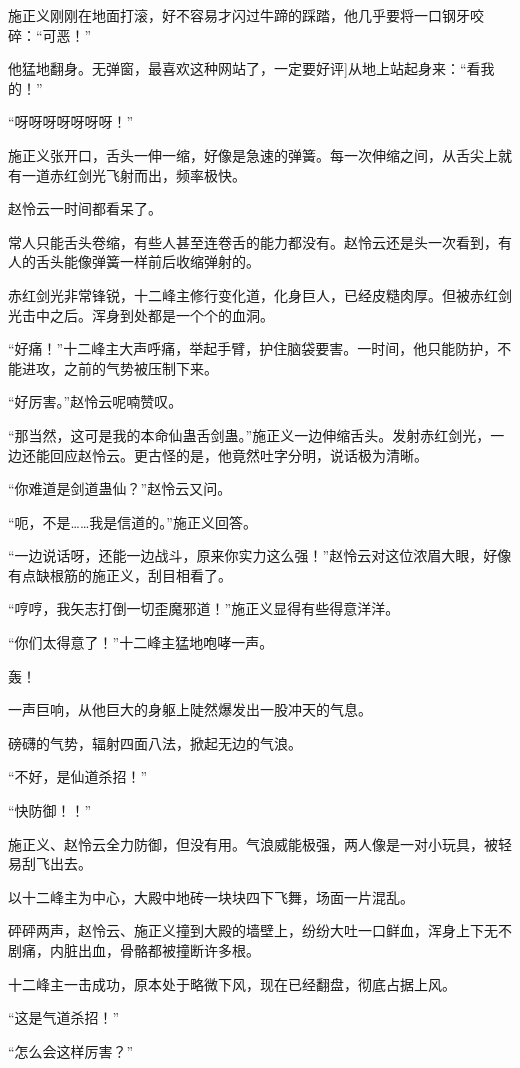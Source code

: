 \begin{this_body}
施正义刚刚在地面打滚，好不容易才闪过牛蹄的踩踏，他几乎要将一口钢牙咬碎：“可恶！”

他猛地翻身。无弹窗，最喜欢这种网站了，一定要好评]从地上站起身来：“看我的！”

“呀呀呀呀呀呀呀！”

施正义张开口，舌头一伸一缩，好像是急速的弹簧。每一次伸缩之间，从舌尖上就有一道赤红剑光飞射而出，频率极快。

赵怜云一时间都看呆了。

常人只能舌头卷缩，有些人甚至连卷舌的能力都没有。赵怜云还是头一次看到，有人的舌头能像弹簧一样前后收缩弹射的。

赤红剑光非常锋锐，十二峰主修行变化道，化身巨人，已经皮糙肉厚。但被赤红剑光击中之后。浑身到处都是一个个的血洞。

“好痛！”十二峰主大声呼痛，举起手臂，护住脑袋要害。一时间，他只能防护，不能进攻，之前的气势被压制下来。

“好厉害。”赵怜云呢喃赞叹。

“那当然，这可是我的本命仙蛊舌剑蛊。”施正义一边伸缩舌头。发射赤红剑光，一边还能回应赵怜云。更古怪的是，他竟然吐字分明，说话极为清晰。

“你难道是剑道蛊仙？”赵怜云又问。

“呃，不是……我是信道的。”施正义回答。

“一边说话呀，还能一边战斗，原来你实力这么强！”赵怜云对这位浓眉大眼，好像有点缺根筋的施正义，刮目相看了。

“哼哼，我矢志打倒一切歪魔邪道！”施正义显得有些得意洋洋。

“你们太得意了！”十二峰主猛地咆哮一声。

轰！

一声巨响，从他巨大的身躯上陡然爆发出一股冲天的气息。

磅礴的气势，辐射四面八法，掀起无边的气浪。

“不好，是仙道杀招！”

“快防御！！”

施正义、赵怜云全力防御，但没有用。气浪威能极强，两人像是一对小玩具，被轻易刮飞出去。

以十二峰主为中心，大殿中地砖一块块四下飞舞，场面一片混乱。

砰砰两声，赵怜云、施正义撞到大殿的墙壁上，纷纷大吐一口鲜血，浑身上下无不剧痛，内脏出血，骨骼都被撞断许多根。

十二峰主一击成功，原本处于略微下风，现在已经翻盘，彻底占据上风。

“这是气道杀招！”

“怎么会这样厉害？”


\end{this_body}
